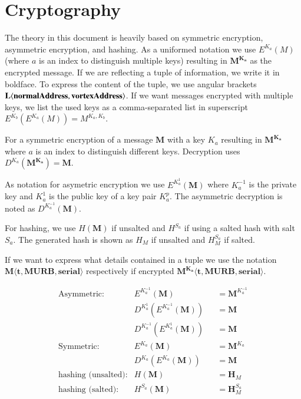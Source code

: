 \section{Cryptography \label{sec:encNot}}
The theory in this document is heavily based on symmetric encryption, asymmetric encryption, and hashing. As a uniformed notation we use $E^{K_a}(M)$ (where $a$ is an index to distinguish multiple keys) resulting in $\mathbf{M^{K_a}}$ as the encrypted message. If we are reflecting a tuple of information, we write it in boldface. To express the content of the tuple, we use angular brackets $\splitatcommas{\mathbf{L\langle normalAddress,vortexAddress\rangle }}$. If we want messages encrypted with multiple keys, we list the used keys as a comma-separated list in superscript $E^{K_b}\left(E^{K_a}\left(M\right)\right)=M^{{K_{a}},{K_b}}$.

For a symmetric encryption of a message $\mathbf{M}$ with a key $K_a$ resulting in $\mathbf{M^{K_a}}$ where $a$ is an index to distinguish different keys. Decryption uses $D^{K_a}(\mathbf{M^{K_a}})=\mathbf{M}$.

As notation for asymetric encryption we use $E^{K^{1}_a}(\mathbf{M})$ where $K^{-1}_a$ is the private key and $K^{1}_a$ is the public key of a key pair $K^p_a$. The asymmetric decryption is noted as $D^{K^{-1}_a}(\mathbf{M})$.

For hashing, we use $H(\mathbf{M})$ if unsalted and $H^{S_a}$ if using a salted hash with salt $S_a$. The generated hash is shown as $H_M$ if unsalted and $H^{S_a}_M$ if salted.

If we want to express what details contained in a tuple we use the notation $\mathbf{M\langle t,MURB,serial\rangle }$ respectively if encrypted $\mathbf{M^{K_{a}}\langle t,MURB,serial\rangle}$.

\begin{align*}
	\text{Asymmetric:}         & E^{K^{-1}_a}\left(\mathbf{M}\right)                            && =\mathbf{M}^{K^{-1}_a}\\
	& D^{K^{1}_a}\left(E^{K^{-1}_a}\left(\mathbf{M}\right)\right)    && =\mathbf{M}\\
	& D^{K^{-1}_a}\left(E^{K^{1}_a}\left(\mathbf{M}\right)\right)    && =\mathbf{M}\\
	\text{Symmetric:}          & E^{K_a}\left(\mathbf{M}\right)                                 && =\mathbf{M}^{K_a}\\
	& D^{K_a}\left(E^{K_a}\left(\mathbf{M}\right)\right)          && =\mathbf{M}\\
	\text{hashing (unsalted):}& H\left(\mathbf{M}\right)                                       && =\mathbf{H}_M\\
	\text{hashing (salted):}  & H^{S_a}\left(\mathbf{M}\right)                                 && =\mathbf{H}^{S_a}_M
\end{align*}

